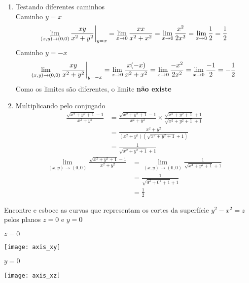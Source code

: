 \documentclass[a4paper,12pt,fleqn]{article}
\begin{document}
\begin{answer}
\begin{enumerate}[label=(\alph*)]
  \item Testando diferentes caminhos \\
  Caminho \(y = x\)
  \[
    \lim_{(x,y) \to (0,0)} \frac{xy}{x^2 + y^2} \bigg\rvert_{y=x}^{}
    = \lim_{x \to 0} \frac{x x}{x^2 + x^2}
    = \lim_{x \to 0} \frac{x^2}{2x^2}
    = \lim_{x \to 0} \frac{1}{2}
    = \frac{1}{2}
  \]
  Caminho \(y = -x\)
  \[
    \lim_{(x,y) \to (0,0)} \frac{xy}{x^2 + y^2} \bigg\rvert_{y=-x}^{}
    = \lim_{x \to 0} \frac{x(-x)}{x^2 + x^2}
    = \lim_{x \to 0} \frac{-x^2}{2x^2}
    = \lim_{x \to 0} \frac{-1}{2}
    = -\frac{1}{2}
  \]
  Como os limites são diferentes, o limite \textbf{não existe}

\item Multiplicando pelo conjugado
  \begin{align*}
    \frac{\sqrt{x^2 + y^2 + 1} - 1}{x^2 + y^2}
    & = \frac{\sqrt{x^2 + y^2 + 1} - 1}{x^2 + y^2}
        \times
        \frac{\sqrt{x^2 + y^2 + 1} + 1}{\sqrt{x^2 + y^2 + 1} + 1} \\
    & = \frac{x^2 + y^2}{(x^2 + y^2)(\sqrt{x^2 + y^2 + 1} + 1)} \\
    & = \frac{1}{\sqrt{x^2 + y^2 + 1} + 1}
  \end{align*}
  \begin{align*}
    \lim_{(x,y) \to (0,0)} \frac{\sqrt{x^2 + y^2 + 1} - 1}{x^2 + y^2}
    & = \lim_{(x,y) \to (0,0)} \frac{1}{\sqrt{x^2 + y^2 + 1} + 1}  \\
    & = \frac{1}{\sqrt{0^2 + 0^2 + 1} + 1}   \\
    & = \frac{1}{2}
  \end{align*}
\end{enumerate}
\end{answer}

Encontre e esboce as curvas que representam os cortes da superfície
\(y^2-x^2=z\)
pelos planos
\(z=0\) e
\(y=0\)
\begin{questiononly}
  \begin{multicols}{2}
  \(z=0\)
  \vspace{-0.8\baselineskip}
  \begin{center}
    \texttt{[image: axis\_xy]}
  \end{center}
  \(y=0\)
  \vspace{-0.8\baselineskip}
  \begin{center}
    \texttt{[image: axis\_xz]}
  \end{center}
\end{multicols}
\end{questiononly}
\end{document}
